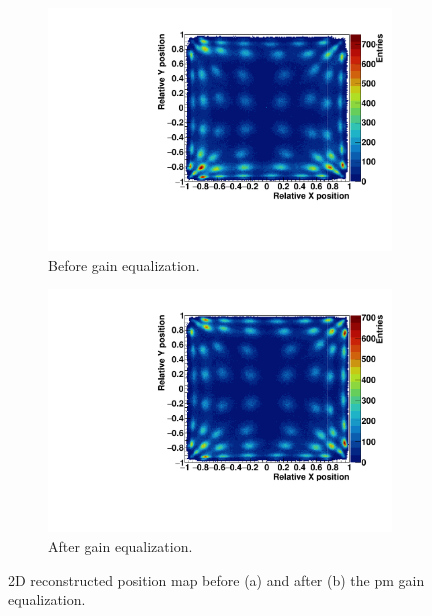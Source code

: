\begin{figure} [!h]
\begin{subfigure}[t]{0.5\textwidth}
\centering
\includegraphics[width=1\textwidth]{03_GraphicFiles/chapter3_CLaRySproto/Absorber/images_charResults_Na22/1_Raw_FLOODMAP.pdf}
\caption{Before gain equalization.}
\label{chap3::fig::absraw_floodMap}
\end{subfigure}
\begin{subfigure}[t]{0.5\textwidth}
\centering
\includegraphics[width=1\textwidth]{03_GraphicFiles/chapter3_CLaRySproto/Absorber/images_charResults_Na22/2_Cal_FLOODMAP.pdf}
\caption{After gain equalization.}
\label{chap3::fig::abscal_floodMap}
\end{subfigure}
\caption{2D reconstructed position map before (a) and after (b) the \gls{pm} gain equalization.}
\label{chap3::fig::absFloodMap}
\end{figure}

